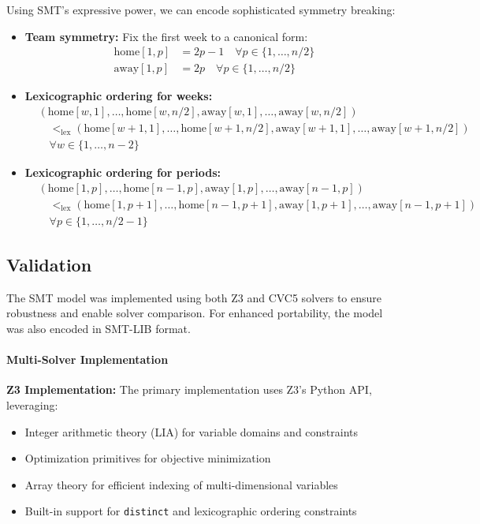 \documentclass[11pt]{article}
\begin{document}
Using SMT's expressive power, we can encode sophisticated symmetry breaking:
\begin{itemize}
    \item \textbf{Team symmetry:} Fix the first week to a canonical form:
    \begin{align}
        \text{home}[1,p] &= 2p-1 \quad \forall p \in \{1, \ldots, n/2\} \\
        \text{away}[1,p] &= 2p \quad \forall p \in \{1, \ldots, n/2\}
    \end{align}

    \item \textbf{Lexicographic ordering for weeks:}
    \begin{align}
        &(\text{home}[w,1], \ldots, \text{home}[w,n/2], \text{away}[w,1], \ldots, \text{away}[w,n/2]) \\
        &\quad <_{\text{lex}} (\text{home}[w+1,1], \ldots, \text{home}[w+1,n/2], \text{away}[w+1,1], \ldots, \text{away}[w+1,n/2]) \\
        &\quad \forall w \in \{1, \ldots, n-2\}
    \end{align}

    \item \textbf{Lexicographic ordering for periods:}
    \begin{align}
        &(\text{home}[1,p], \ldots, \text{home}[n-1,p], \text{away}[1,p], \ldots, \text{away}[n-1,p]) \\
        &\quad <_{\text{lex}} (\text{home}[1,p+1], \ldots, \text{home}[n-1,p+1], \text{away}[1,p+1], \ldots, \text{away}[n-1,p+1]) \\
        &\quad \forall p \in \{1, \ldots, n/2-1\}
    \end{align}
\end{itemize}

\subsection{Validation}

The SMT model was implemented using both Z3 and CVC5 solvers to ensure robustness and enable solver comparison. For enhanced portability, the model was also encoded in SMT-LIB format.

\paragraph{Multi-Solver Implementation}

\textbf{Z3 Implementation:} The primary implementation uses Z3's Python API, leveraging:
\begin{itemize}
    \item Integer arithmetic theory (LIA) for variable domains and constraints
    \item Optimization primitives for objective minimization
    \item Array theory for efficient indexing of multi-dimensional variables
    \item Built-in support for \texttt{distinct} and lexicographic ordering constraints
\end{itemize}
\end{document}
